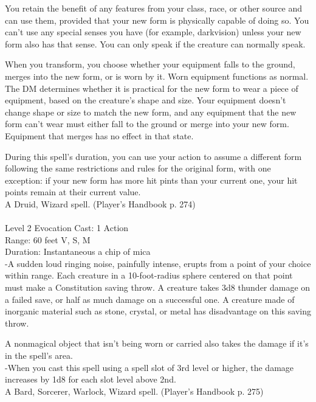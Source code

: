 \documentclass[10pt,twocolumn]{report}
\begin{document}
You retain the benefit of any features from your class, race, or other source and can use them, provided that your new form is physically capable of doing so. You can’t use any special senses you have (for example, darkvision) unless your new form also has that sense. You can only speak if the creature can normally speak.

When you transform, you choose whether your equipment falls to the ground, merges into the new form, or is worn by it. Worn equipment functions as normal. The DM determines whether it is practical for the new form to wear a piece of equipment, based on the creature’s shape and size. Your equipment doesn’t change shape or size to match the new form, and any equipment that the new form can’t wear must either fall to the ground or merge into your new form. Equipment that merges has no effect in that state.

During this spell’s duration, you can use your action to assume a different form following the same restrictions and rules for the original form, with one exception: if your new form has more hit pints than your current one, your hit points remain at their current value.\\
A Druid, Wizard spell. (Player's Handbook p. 274) \\


 \\
Level 2 \quad Evocation \quad Cast: 1 Action\\
Range: 60 feet \quad V, S, M\\
Duration: Instantaneous \quad a chip of mica\\
-A sudden loud ringing noise, painfully intense, erupts from a point of your choice within range. Each creature in a 10-foot-radius sphere centered on that point must make a Constitution saving throw. A creature takes 3d8 thunder damage on a failed save, or half as much damage on a successful one. A creature made of inorganic material such as stone, crystal, or metal has disadvantage on this saving throw.

A nonmagical object that isn’t being worn or carried also takes the damage if it’s in the spell’s area.\\
-When you cast this spell using a spell slot of 3rd level or higher, the damage increases by 1d8 for each slot level above 2nd.\\
A Bard, Sorcerer, Warlock, Wizard spell. (Player's Handbook p. 275) \\
\end{document}
